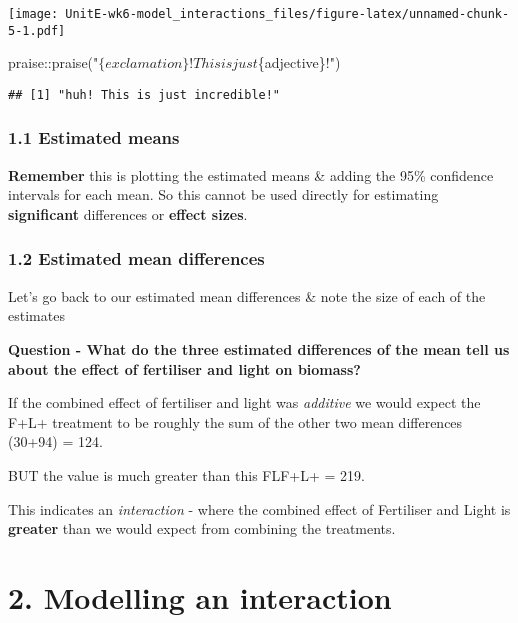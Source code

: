 \documentclass[
]{article}
\newenvironment{Shaded}{\begin{snugshade}}{\end{snugshade}}
\newcommand{\FunctionTok}[1]{\textcolor[rgb]{0.00,0.00,0.00}{#1}}
\newcommand{\NormalTok}[1]{#1}
\newcommand{\SpecialCharTok}[1]{\textcolor[rgb]{0.00,0.00,0.00}{#1}}
\newcommand{\StringTok}[1]{\textcolor[rgb]{0.31,0.60,0.02}{#1}}
\begin{document}
\texttt{[image: UnitE-wk6-model\_interactions\_files/figure-latex/unnamed-chunk-5-1.pdf]}

\begin{Shaded}
\begin{Highlighting}[]
\NormalTok{praise}\SpecialCharTok{::}\FunctionTok{praise}\NormalTok{(}\StringTok{"$\{exclamation\}! This is just $\{adjective\}!"}\NormalTok{)}
\end{Highlighting}
\end{Shaded}

\begin{verbatim}
## [1] "huh! This is just incredible!"
\end{verbatim}

\hypertarget{estimated-means}{%
\subsubsection{1.1 Estimated means}\label{estimated-means}}

\textbf{Remember} this is plotting the estimated means \& adding the
95\% confidence intervals for each mean. So this cannot be used directly
for estimating \textbf{significant} differences or \textbf{effect
sizes}.

\hypertarget{estimated-mean-differences}{%
\subsubsection{1.2 Estimated mean
differences}\label{estimated-mean-differences}}

Let's go back to our estimated mean differences \& note the size of each
of the estimates

\textbf{Question - What do the three estimated differences of the mean
tell us about the effect of fertiliser and light on biomass?}

If the combined effect of fertiliser and light was \emph{additive} we
would expect the F+L+ treatment to be roughly the sum of the other two
mean differences (30+94) = 124.

BUT the value is much greater than this FLF+L+ = 219.

This indicates an \emph{interaction} - where the combined effect of
Fertiliser and Light is \textbf{greater} than we would expect from
combining the treatments.

\hypertarget{modelling-an-interaction}{%
\section{2. Modelling an interaction}\label{modelling-an-interaction}}
\end{document}
